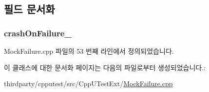 \subsection{필드 문서화}
\subsubsection[{\texorpdfstring{crash\+On\+Failure\+\_\+}{crashOnFailure_}}]{ crash\+On\+Failure\+\_\+\hspace{0.3cm}{\ttfamily [private]}}\hypertarget{class_mock_failure_reporter_test_terminator_a9faf961cbe6687577f4eaae4625bcbea}{}\label{class_mock_failure_reporter_test_terminator_a9faf961cbe6687577f4eaae4625bcbea}


Mock\+Failure.\+cpp 파일의 53 번째 라인에서 정의되었습니다.



이 클래스에 대한 문서화 페이지는 다음의 파일로부터 생성되었습니다.\+:\begin{DoxyCompactItemize}
\item 
thirdparty/cpputest/src/\+Cpp\+U\+Test\+Ext/\hyperlink{_mock_failure_8cpp}{Mock\+Failure.\+cpp}\end{DoxyCompactItemize}
